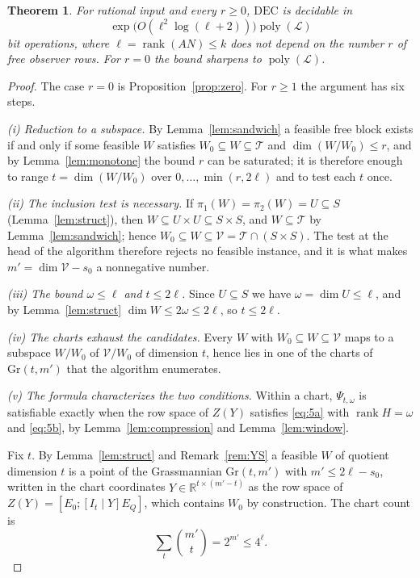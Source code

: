\documentclass[journal]{IEEEtran}
\theoremstyle{plainn}
\newtheorem{thm}{Theorem}
\theoremstyle{remark}
\begin{document}
\begin{thm}\label{thm:fpt}
For rational input and every $r\ge0$, $\mathrm{DEC}$ is decidable in
\begin{equation}\label{eq:fpt-l}
\exp\bigl(O(\ell^2\log(\ell+2))\bigr)\operatorname{poly}(\mathcal L)
\end{equation}
bit operations, where $\ell=\operatorname{rank}(AN)\le k$ does not depend on the number $r$ of
free observer rows. For $r=0$ the bound sharpens to $\operatorname{poly}(\mathcal L)$.
\end{thm}

\begin{proof}
The case $r=0$ is Proposition~\ref{prop:zero}. For $r\ge1$ the argument has six steps.

\emph{(i) Reduction to a subspace.} By Lemma~\ref{lem:sandwich} a feasible free block exists if and
only if some feasible $W$ satisfies $W_0\subseteq W\subseteq\mathcal T$ and
$\dim(W/W_0)\le r$, and by Lemma~\ref{lem:monotone} the bound $r$ can be saturated; it is therefore
enough to range $t=\dim(W/W_0)$ over $0,\dots,\min(r,2\ell)$ and to test each $t$ once.

\emph{(ii) The inclusion test is necessary.} If $\pi_1(W)=\pi_2(W)=U\subseteq S$
(Lemma~\ref{lem:struct}), then $W\subseteq U\times U\subseteq S\times S$, and $W\subseteq\mathcal T$
by Lemma~\ref{lem:sandwich}; hence $W_0\subseteq W\subseteq\mathcal V=\mathcal T\cap(S\times S)$.
The test at the head of the algorithm therefore rejects no feasible instance, and it is what makes
$m'=\dim\mathcal V-s_0$ a nonnegative number.

\emph{(iii) The bound $\omega\le\ell$ and $t\le2\ell$.} Since $U\subseteq S$ we have
$\omega=\dim U\le\ell$, and by Lemma~\ref{lem:struct} $\dim W\le2\omega\le2\ell$, so
$t\le2\ell$.

\emph{(iv) The charts exhaust the candidates.} Every $W$ with
$W_0\subseteq W\subseteq\mathcal V$ maps to a subspace $W/W_0$ of $\mathcal V/W_0$ of dimension
$t$, hence lies in one of the charts of $\mathrm{Gr}(t,m')$ that the algorithm enumerates.

\emph{(v) The formula characterizes the two conditions.} Within a chart, $\Psi_{t,\omega}$ is
satisfiable exactly when the row space of $Z(Y)$ satisfies \eqref{eq:5a} with
$\operatorname{rank}H=\omega$ and \eqref{eq:5b}, by Lemma~\ref{lem:compression} and
Lemma~\ref{lem:window}.

Fix $t$. By Lemma~\ref{lem:struct} and Remark~\ref{rem:YS} a feasible $W$ of quotient dimension
$t$ is a point of the Grassmannian $\mathrm{Gr}(t,m')$ with $m'\le2\ell-s_0$, written in the chart
coordinates $Y\in\mathbb R^{t\times(m'-t)}$ as the row space of $Z(Y)=[E_0;[I_t\mid Y]E_Q]$, which
contains $W_0$ by construction. The chart count is
\begin{equation}\label{eq:charts}
\sum_{t}\binom{m'}{t}=2^{m'}\le4^{\ell}.
\end{equation}


\end{proof}
\end{document}
